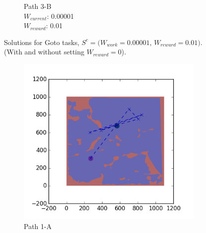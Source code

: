 \documentclass{tamuccthesis}
\begin{document}
\begin{figure}
\begin{subfigure}[b]{0.24\textwidth}
        \caption{{\small Path 3-B \\ $W_{current}$: 0.00001 \\ $W_{reward}$: 0.01}}   
        \label{fig:Path_3-B_upReward_Work}
    \end{subfigure}
    \caption[Solutions for Goto tasks using weights $S^c$.]{Solutions for Goto tasks, $S^c = (W_{work} = 0.00001$, $W_{reward} = 0.01)$. \\ (With and without setting $W_{reward} = 0$).}
    \label{fig:weights_Sc}
\end{figure}

\begin{figure}
    \centering
    \begin{subfigure}[b]{0.24\textwidth}
        \centering
            \includegraphics[width=\textwidth,trim={4cm 3cm 2cm 3cm},clip]{EXP3RG_PathAa_-1_-1_0d001_0d01.png}
        \caption{Path 1-A}    
        \label{fig:Path_1-A_upReward_upWork}
    \end{subfigure}
    \begin{subfigure}[b]{0.24\textwidth}  
        \centering 

\end{subfigure}
\end{figure}
\end{document}
